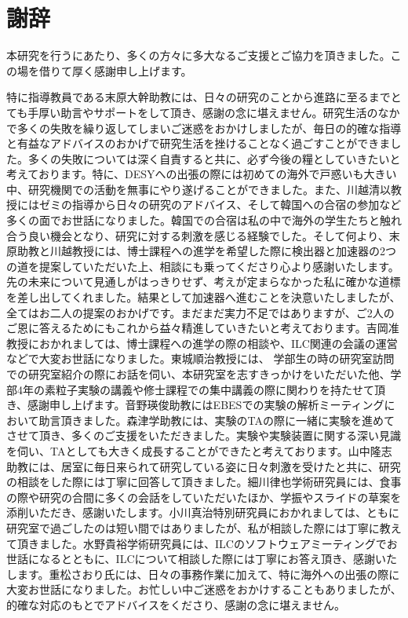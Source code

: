 
\clearpage

\chapter*{謝辞} \label{sec:Acknowledgement}
本研究を行うにあたり、多くの方々に多大なるご支援とご協力を頂きました。この場を借りて厚く感謝申し上げます。

特に指導教員である末原大幹助教には、日々の研究のことから進路に至るまでとても手厚い助言やサポートをして頂き、感謝の念に堪えません。研究生活のなかで多くの失敗を繰り返してしまいご迷惑をおかけしましたが、毎日の的確な指導と有益なアドバイスのおかげで研究生活を挫けることなく過ごすことができました。多くの失敗については深く自責すると共に、必ず今後の糧としていきたいと考えております。特に、DESYへの出張の際には初めての海外で戸惑いも大きい中、研究機関での活動を無事にやり遂げることができました。また、川越清以教授にはゼミの指導から日々の研究のアドバイス、そして韓国への合宿の参加など多くの面でお世話になりました。韓国での合宿は私の中で海外の学生たちと触れ合う良い機会となり、研究に対する刺激を感じる経験でした。そして何より、末原助教と川越教授には、博士課程への進学を希望した際に検出器と加速器の2つの道を提案していただいた上、相談にも乗ってくださり心より感謝いたします。先の未来について見通しがはっきりせず、考えが定まらなかった私に確かな道標を差し出してくれました。結果として加速器へ進むことを決意いたしましたが、全てはお二人の提案のおかげです。まだまだ実力不足ではありますが、ご2人のご恩に答えるためにもこれから益々精進していきたいと考えております。吉岡准教授におかれましては、博士課程への進学の際の相談や、ILC関連の会議の運営などで大変お世話になりました。東城順治教授には、 学部生の時の研究室訪問での研究室紹介の際にお話を伺い、本研究室を志すきっかけをいただいた他、学部4年の素粒子実験の講義や修士課程での集中講義の際に関わりを持たせて頂き、感謝申し上げます。音野瑛俊助教にはEBESでの実験の解析ミーティングにおいて助言頂きました。森津学助教には、実験のTAの際に一緒に実験を進めてさせて頂き、多くのご支援をいただきました。実験や実験装置に関する深い見識を伺い、TAとしても大きく成長することができたと考えております。山中隆志助教には、居室に毎日来られて研究している姿に日々刺激を受けたと共に、研究の相談をした際には丁寧に回答して頂きました。細川律也学術研究員には、食事の際や研究の合間に多くの会話をしていただいたほか、学振やスライドの草案を添削いただき、感謝いたします。小川真治特別研究員におかれましては、ともに研究室で過ごしたのは短い間ではありましたが、私が相談した際には丁寧に教えて頂きました。水野貴裕学術研究員には、ILCのソフトウェアミーティングでお世話になるとともに、ILCについて相談した際には丁寧にお答え頂き、感謝いたします。重松さおり氏には、日々の事務作業に加えて、特に海外への出張の際に大変お世話になりました。お忙しい中ご迷惑をおかけすることもありましたが、的確な対応のもとでアドバイスをくださり、感謝の念に堪えません。

